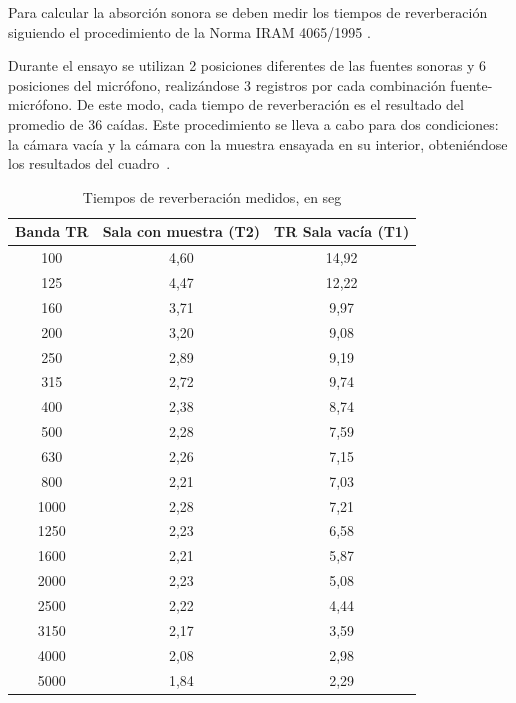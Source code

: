 \par Para calcular la absorción sonora se deben medir los tiempos de reverberación siguiendo el procedimiento de la Norma IRAM 4065/1995 .

Durante el ensayo se utilizan 2 posiciones diferentes de las fuentes sonoras y 6 posiciones del micrófono, realizándose 3 registros por cada combinación fuente-micrófono. De este modo, cada tiempo de reverberación es el resultado del promedio de 36 caídas. Este procedimiento se lleva a cabo para dos condiciones: la cámara vacía y la cámara con la muestra ensayada en su interior, obteniéndose los resultados del cuadro~.


\begin{table}[H]
    \centering
    \begin{tabular}{|c|c|c|} \hline
        \textbf{Banda TR} & \textbf{Sala con muestra (T2)}& \textbf{TR Sala vacía (T1)} \\ \hline \hline
        100&	4,60&	14,92\\ \hline
        125&	4,47&	12,22 \\ \hline
        160&	3,71&	9,97 \\ \hline
        200&	3,20&	9,08 \\ \hline
        250&	2,89&	9,19 \\ \hline
        315&	2,72&	9,74 \\ \hline
        400&	2,38&	8,74 \\ \hline
        500&	2,28&	7,59 \\ \hline
        630&	2,26&	7,15\\ \hline
        800&	2,21&	7,03 \\ \hline
        1000&	2,28&	7,21 \\ \hline
        1250&	2,23&	6,58 \\ \hline
        1600&	2,21&	5,87 \\ \hline
        2000&	2,23&	5,08 \\ \hline
        2500&	2,22&	4,44 \\ \hline
        3150&	2,17&	3,59 \\ \hline
        4000&	2,08&	2,98 \\ \hline
        5000&	1,84&	2,29 \\ \hline
    \end{tabular}
    \caption{Tiempos de reverberación medidos, en seg}
    \label{tab:Tiempos_reverberacion}
\end{table}

